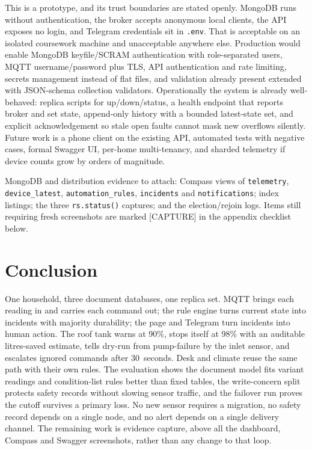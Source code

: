 \documentclass[11pt,a4paper]{article}
\begin{document}
This is a prototype, and its trust boundaries are stated openly. MongoDB runs without authentication, the broker accepts anonymous local clients, the API exposes no login, and Telegram credentials sit in \texttt{.env}. That is acceptable on an isolated coursework machine and unacceptable anywhere else. Production would enable MongoDB keyfile/SCRAM authentication with role-separated users, MQTT username/password plus TLS, API authentication and rate limiting, secrets management instead of flat files, and validation already present extended with JSON-schema collection validators. Operationally the system is already well-behaved: replica scripts for up/down/status, a health endpoint that reports broker and set state, append-only history with a bounded latest-state set, and explicit acknowledgement so stale open faults cannot mask new overflows silently. Future work is a phone client on the existing API, automated tests with negative cases, formal Swagger UI, per-home multi-tenancy, and sharded telemetry if device counts grow by orders of magnitude.

MongoDB and distribution evidence to attach: Compass views of \texttt{telemetry}, \texttt{device\_latest}, \texttt{automation\_rules}, \texttt{incidents} and \texttt{notifications}; index listings; the three \texttt{rs.status()} captures; and the election/rejoin logs. Items still requiring fresh screenshots are marked [CAPTURE] in the appendix checklist below.

\section{Conclusion}

One household, three document databases, one replica set. MQTT brings each reading in and carries each command out; the rule engine turns current state into incidents with majority durability; the page and Telegram turn incidents into human action. The roof tank warns at 90\%, stops itself at 98\% with an auditable litres-saved estimate, tells dry-run from pump-failure by the inlet sensor, and escalates ignored commands after 30~seconds. Desk and climate reuse the same path with their own rules. The evaluation shows the document model fits variant readings and condition-list rules better than fixed tables, the write-concern split protects safety records without slowing sensor traffic, and the failover run proves the cutoff survives a primary loss. No new sensor requires a migration, no safety record depends on a single node, and no alert depends on a single delivery channel. The remaining work is evidence capture, above all the dashboard, Compass and Swagger screenshots, rather than any change to that loop.
\end{document}
